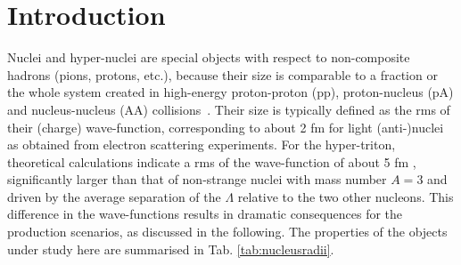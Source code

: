 \documentclass[%
 reprint,
 amsmath,amssymb,
 aps,
]{revtex4-1}
\begin{document}
\section{Introduction} 
Nuclei and hyper-nuclei are special objects with respect to non-composite hadrons (pions, protons, etc.), because their size is comparable to a fraction or the whole system created in high-energy proton-proton (pp), proton-nucleus (pA) and nucleus-nucleus (AA) collisions~\cite{Adam:2015vna}.  
Their size is typically defined as the rms of their (charge) wave-function, corresponding to about 2 fm for light (anti-)nuclei as obtained from electron scattering experiments. 
For the hyper-triton, theoretical calculations indicate a rms of the wave-function of about 5 fm \cite{Nemura:1999qp}, significantly larger than that of non-strange nuclei with mass number $A = 3$ and driven by the average separation of the $\Lambda$ relative to the two other nucleons. 
This difference in the wave-functions results in dramatic consequences for the production scenarios, as discussed in the following.
The properties of the objects under study here are summarised in Tab. \ref{tab:nucleusradii}.
\end{document}
